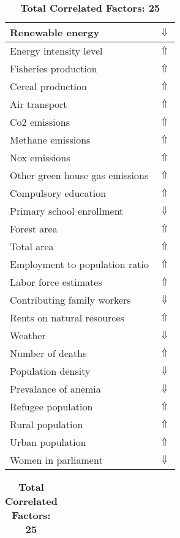 \documentclass[12pt,notitlepage,oneside]{report}
\begin{document}
\begin{table}[!htb]
\caption{\textbf{Puts At High Risk: Livestock workers $\Uparrow$}}
\centering
\label{Correlated Socio-economic Factors0}
\begin{tabular}{|l|l|}
\hline
Renewable energy & $\Downarrow$\\ \hline
Energy intensity level & $\Uparrow$\\ \hline
Fisheries production & $\Uparrow$\\ \hline
Cereal production & $\Uparrow$\\ \hline
Air transport  & $\Uparrow$\\ \hline
Co2 emissions & $\Uparrow$\\ \hline
Methane emissions & $\Uparrow$\\ \hline
Nox emissions & $\Uparrow$\\ \hline
Other green house gas emissions & $\Uparrow$\\ \hline
Compulsory education & $\Uparrow$\\ \hline
Primary school enrollment & $\Downarrow$\\ \hline
Forest area & $\Uparrow$\\ \hline
Total area & $\Uparrow$\\ \hline
Employment to population ratio & $\Uparrow$\\ \hline
Labor force estimates & $\Uparrow$\\ \hline
Contributing family workers & $\Downarrow$\\ \hline
Rents on natural resources & $\Uparrow$\\ \hline
Weather & $\Downarrow$\\ \hline
Number of deaths & $\Uparrow$\\ \hline
Population density & $\Downarrow$\\ \hline
Prevalance of anemia & $\Downarrow$\\ \hline
Refugee population & $\Uparrow$\\ \hline
Rural population & $\Uparrow$\\ \hline
Urban population & $\Uparrow$\\ \hline
Women in parliament & $\Downarrow$\\ \hline
\end{tabular}
\begin{tabular}{|l|l|}
\hline
\end{tabular}
\caption*{\textbf{Total Correlated Factors: 25}}
\end{table}
\clearpage
\end{document}
